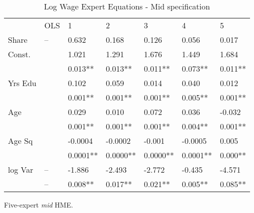 \documentclass[12pt]{article}
\begin{document}
\begin{table} \centering
  \caption{Log Wage Expert Equations - Mid specification}
  \begin{threeparttable}
    \begin{tabular}[l]{l l l l l l l}
      \cmidrule{1-7}

                  & OLS & 1       & 2       &3 &4 & 5  \\
      \cmidrule{1-7}

      Share       & --  & 0.632   & 0.168   & 0.126   & 0.056   & 0.017     \\[0.3cm]

      Const.      &     & 1.021   & 1.291   & 1.676   & 1.449   & 1.684    \\
                  &     & 0.013** & 0.013** & 0.011** & 0.073** & 0.011**   \\[0.3cm]
      
      Yrs Edu     &     & 0.102   & 0.059   & 0.014   & 0.040   & 0.012    \\
                  &     & 0.001** & 0.001** & 0.001** & 0.005** & 0.001**  \\[0.3cm]

      Age         &     & 0.029   & 0.010   & 0.072   & 0.036   & -0.032    \\
                  &     & 0.001** & 0.001** & 0.001** & 0.004** & 0.001**  \\[0.3cm]

      Age Sq      &     & -0.0004 & -0.0002 & -0.001  & -0.0005 & 0.005   \\
                  &     & 0.0001**& 0.0000**& 0.0000**& 0.0001**& 0.000**  \\[0.3cm]
      
      log Var     & --   & -1.886 & -2.493  & -2.772  & -0.435  & -4.571     \\
                  & --   & 0.008**& 0.017** & 0.021** & 0.005** & 0.085**    \\[0.3cm]


      \hline
    \end{tabular}
    \begin{tablenotes}
      \item[1]{\footnotesize Five-expert \textit{mid} HME.}
    \end{tablenotes} \label{tbl:model_local_expert_regressions}
  \end{threeparttable}
\end{table}
\end{document}
